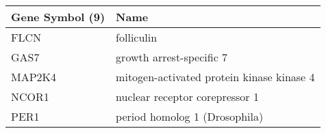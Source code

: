 \begin{tabular}{ll}
\toprule
Gene Symbol (9) &                                      Name \\
\midrule
           FLCN &                                folliculin \\
           GAS7 &                  growth arrest-specific 7 \\
         MAP2K4 & mitogen-activated protein kinase kinase 4 \\
          NCOR1 &            nuclear receptor corepressor 1 \\
           PER1 &             period homolog 1 (Drosophila) \\
\bottomrule
\end{tabular}
